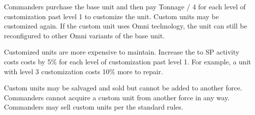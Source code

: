 Commanders purchase the base unit and then pay Tonnage / 4 for each level of customization past level 1 to customize the unit.
Custom units may be customized again.
If the custom unit uses Omni technology, the unit can still be reconfigured to other Omni variants of the base unit.

Customized units are more expensive to maintain.
Increase the to SP activity costs costs by 5\% for each level of customization past level 1.
For example, a unit with level 3 customization costs 10\% more to repair.

Custom units may be salvaged and sold but cannot be added to another force.
Commanders cannot acquire a custom unit from another force in any way.
Commanders may sell custom units per the standard rules.
